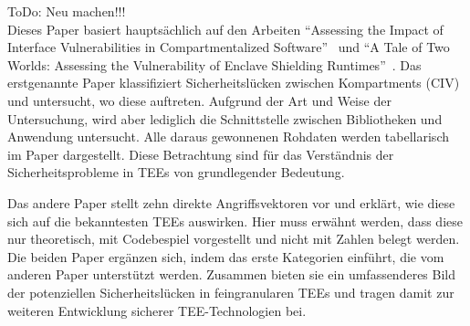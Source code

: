 ToDo: Neu machen!!!\\


Dieses Paper basiert hauptsächlich auf den Arbeiten \enquote{Assessing the Impact of Interface Vulnerabilities in Compartmentalized Software}~\cite{CIVPaper} und \enquote{A Tale of Two Worlds: Assessing the Vulnerability of Enclave Shielding Runtimes}~\cite{TEEPaper}. 
Das erstgenannte Paper klassifiziert Sicherheitslücken zwischen Kompartments (CIV) und untersucht, wo diese auftreten. Aufgrund der Art und Weise der Untersuchung, wird aber lediglich die Schnittstelle zwischen Bibliotheken und Anwendung untersucht. 
Alle daraus gewonnenen Rohdaten werden tabellarisch im Paper dargestellt. 
Diese Betrachtung sind für das Verständnis der Sicherheitsprobleme in TEEs von grundlegender Bedeutung.

Das andere Paper stellt zehn direkte Angriffsvektoren vor und erklärt, wie diese sich auf die bekanntesten TEEs auswirken. Hier muss erwähnt werden, dass diese nur theoretisch, mit Codebespiel vorgestellt und nicht mit Zahlen belegt werden.
Die beiden Paper ergänzen sich, indem das erste Kategorien einführt, die vom anderen Paper unterstützt werden. Zusammen bieten sie ein umfassenderes Bild der potenziellen Sicherheitslücken in feingranularen TEEs und tragen damit zur weiteren Entwicklung sicherer TEE-Technologien bei. 

